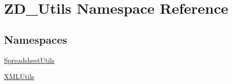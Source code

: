 \hypertarget{namespace_z_d___utils}{\section{Z\-D\-\_\-\-Utils Namespace Reference}
\label{namespace_z_d___utils}
}
\subsection*{Namespaces}
\begin{DoxyCompactItemize}
\item 
\hyperlink{namespace_z_d___utils_1_1_spreadsheet_utils}{Spreadsheet\-Utils}
\item 
\hyperlink{namespace_z_d___utils_1_1_x_m_l_utils}{X\-M\-L\-Utils}
\end{DoxyCompactItemize}
